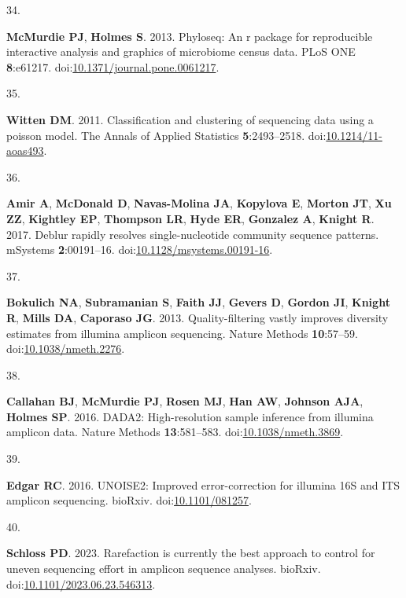 \documentclass[
]{article}
\newlength{\cslhangindent}
\newlength{\csllabelwidth}
\newlength{\cslentryspacingunit} %
\newenvironment{CSLReferences}[2] %
 {%
  \setlength{\parindent}{0pt}
  \ifodd #1
  \let\oldpar\par
  \def\par{\hangindent=\cslhangindent\oldpar}
  \fi
  \setlength{\parskip}{#2\cslentryspacingunit}
 }%
 {}
\newcommand{\CSLLeftMargin}[1]{\parbox[t]{\csllabelwidth}{#1}}
\newcommand{\CSLRightInline}[1]{\parbox[t]{\linewidth - \csllabelwidth}{#1}\break}
\begin{document}
\begin{CSLReferences}{0}{1}
\leavevmode{}%
\CSLLeftMargin{34. }%
\CSLRightInline{\textbf{McMurdie PJ}, \textbf{Holmes S}. 2013. Phyloseq:
An r package for reproducible interactive analysis and graphics of
microbiome census data. {PLoS} {ONE} \textbf{8}:e61217.
doi:\href{https://doi.org/10.1371/journal.pone.0061217}{10.1371/journal.pone.0061217}.}

\leavevmode{}%
\CSLLeftMargin{35. }%
\CSLRightInline{\textbf{Witten DM}. 2011. Classification and clustering
of sequencing data using a poisson model. The Annals of Applied
Statistics \textbf{5}:2493--2518.
doi:\href{https://doi.org/10.1214/11-aoas493}{10.1214/11-aoas493}.}

\leavevmode{}%
\CSLLeftMargin{36. }%
\CSLRightInline{\textbf{Amir A}, \textbf{McDonald D},
\textbf{Navas-Molina JA}, \textbf{Kopylova E}, \textbf{Morton JT},
\textbf{Xu ZZ}, \textbf{Kightley EP}, \textbf{Thompson LR}, \textbf{Hyde
ER}, \textbf{Gonzalez A}, \textbf{Knight R}. 2017. Deblur rapidly
resolves single-nucleotide community sequence patterns. {mSystems}
\textbf{2}:00191--16.
doi:\href{https://doi.org/10.1128/msystems.00191-16}{10.1128/msystems.00191-16}.}

\leavevmode{}%
\CSLLeftMargin{37. }%
\CSLRightInline{\textbf{Bokulich NA}, \textbf{Subramanian S},
\textbf{Faith JJ}, \textbf{Gevers D}, \textbf{Gordon JI}, \textbf{Knight
R}, \textbf{Mills DA}, \textbf{Caporaso JG}. 2013. Quality-filtering
vastly improves diversity estimates from illumina amplicon sequencing.
Nature Methods \textbf{10}:57--59.
doi:\href{https://doi.org/10.1038/nmeth.2276}{10.1038/nmeth.2276}.}

\leavevmode{}%
\CSLLeftMargin{38. }%
\CSLRightInline{\textbf{Callahan BJ}, \textbf{McMurdie PJ},
\textbf{Rosen MJ}, \textbf{Han AW}, \textbf{Johnson AJA}, \textbf{Holmes
SP}. 2016. {DADA}2: High-resolution sample inference from illumina
amplicon data. Nature Methods \textbf{13}:581--583.
doi:\href{https://doi.org/10.1038/nmeth.3869}{10.1038/nmeth.3869}.}

\leavevmode{}%
\CSLLeftMargin{39. }%
\CSLRightInline{\textbf{Edgar RC}. 2016. {UNOISE}2: Improved
error-correction for illumina 16S and {ITS} amplicon sequencing.
bio{R}xiv. doi:\href{https://doi.org/10.1101/081257}{10.1101/081257}.}

\leavevmode{}%
\CSLLeftMargin{40. }%
\CSLRightInline{\textbf{Schloss PD}. 2023. Rarefaction is currently the
best approach to control for uneven sequencing effort in amplicon
sequence analyses. bio{R}xiv.
doi:\href{https://doi.org/10.1101/2023.06.23.546313}{10.1101/2023.06.23.546313}.}


\end{CSLReferences}
\end{document}
